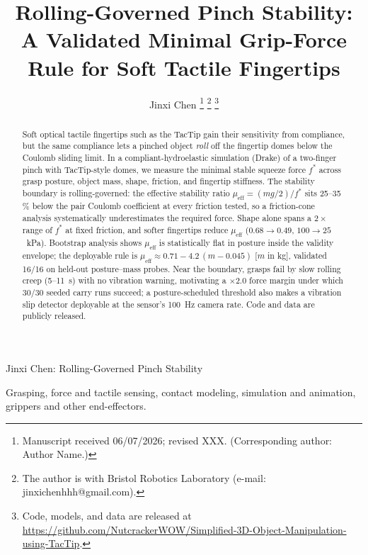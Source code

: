 \documentclass[journal]{IEEEtran}
\newcommand{\mueff}{\mu_{\mathrm{eff}}}
\newcommand{\fstar}{f^{*}}
\newcommand{\repourl}{\url{https://github.com/NutcrackerWOW/Simplified-3D-Object-Manipulation-using-TacTip}}
\begin{document}
\title{Rolling-Governed Pinch Stability: A Validated Minimal Grip-Force
  Rule for Soft Tactile Fingertips}

\author{Jinxi Chen%
  \thanks{Manuscript received 06/07/2026; revised XXX. (Corresponding author:
    Author Name.)}%
  \thanks{The author is with Bristol Robotics Laboratory (e-mail: jinxichenhhh@gmail.com).}%
  \thanks{Code, models, and data are released at
    \protect\repourl.}%
}

%
{Jinxi Chen: Rolling-Governed Pinch Stability}

\maketitle

\begin{abstract}
Soft optical tactile fingertips such as the TacTip gain their sensitivity
from compliance, but the same compliance lets a pinched object \emph{roll}
off the fingertip domes below the Coulomb sliding limit. In a
compliant-hydroelastic simulation (Drake) of a two-finger pinch with
TacTip-style domes, we measure the minimal stable squeeze force $\fstar$
across grasp posture, object mass, shape, friction, and fingertip
stiffness. The stability boundary is rolling-governed: the effective
stability ratio $\mueff = (mg/2)/\fstar$ sits 25--35\,\% below the pair
Coulomb coefficient at every friction tested, so a friction-cone analysis
systematically underestimates the required force. Shape alone spans a
$2\times$ range of $\fstar$ at fixed friction, and softer fingertips reduce
$\mueff$ ($0.68 \to 0.49$, $100 \to 25$~kPa). Bootstrap analysis shows
$\mueff$ is statistically flat in posture inside the validity envelope; the
deployable rule is $\mueff \approx 0.71 - 4.2\,(m - 0.045)$ [$m$ in kg],
validated 16/16 on held-out posture--mass probes. Near the boundary, grasps
fail by slow rolling creep (5--11~s) with no vibration warning, motivating
a $\times 2.0$ force margin under which 30/30 seeded carry runs succeed; a
posture-scheduled threshold also makes a vibration slip detector deployable
at the sensor's 100~Hz camera rate. Code and data are publicly released.
\end{abstract}

\begin{IEEEkeywords}
Grasping, force and tactile sensing, contact modeling, simulation and
animation, grippers and other end-effectors.
\end{IEEEkeywords}
\end{document}
